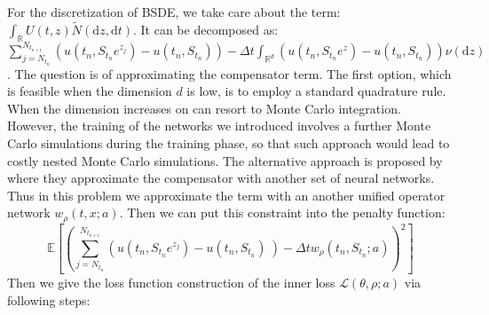 \documentclass[11pt,a4paper]{article}
\theoremstyle{remark}
\begin{document}
	For the discretization of BSDE,  we take care about the term: $\int_{\mathbb{R}}U(t,z) \tilde{N}\left(\mathrm{d} z, \mathrm{d} t\right) $. It can be decomposed as: $\sum_{j=N_{t_n}}^{N_{t_{n+1}}}\left(u(t_n, S_{t_n}e^{z_j}) - u(t_n, S_{t_n})\right) - \Delta t \int_{\mathbb{R}^d}\left(u(t_n, S_{t_n}e^{z}) - u(t_n, S_{t_n})\right)\nu(\mathrm{d}z)$. The question is of approximating the compensator term. The first option, which is feasible when the dimension $d$ is low, is to employ a standard quadrature rule. When the dimension increases on can resort to Monte Carlo integration. However, the training of the networks we introduced involves a further Monte Carlo simulations during the training phase, so that such approach would lead to costly nested Monte Carlo simulations. The alternative approach is proposed by \cite{gnoatto2022deep} where they approximate the compensator with another set of neural networks. Thus in this problem we approximate the term with an another unified operator network $w_{\rho}(t, x; a)$. Then we can put this constraint into the penalty function:
	\begin{equation*}
		\mathbb{E}\left[\left(\sum_{j=N_{t_n}}^{N_{t_{n+1}}}\left( u(t_n, S_{t_n}e^{z_j}) - u(t_n, S_{t_n})\ \right)-\Delta t w_{\rho}\left(t_n, S_{t_n}; a\right)\right)^2\right]
	\end{equation*}
	Then we give the loss function construction of the inner loss $\mathcal{L}(\theta,\rho; a)$ via following steps:
\end{document}

